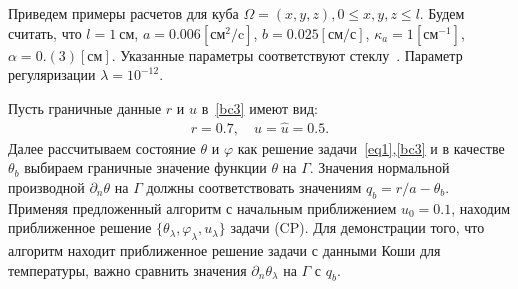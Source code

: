 \documentclass[12pt]{article}
\begin{document}
    Приведем примеры расчетов для куба
    $\Omega = {(x, y, z), 0 \leq x,y,z \leq l}$.
    Будем считать, что $l=1~\text{см}$, $a = 0.006[\text{см}^2/\text{c}]$,
    $b=0.025[\text{см}/\text{с}]$,
    $\kappa_a=1[\text{см}^{-1}]$, $\alpha = 0.(3)[\text{см}]$.
    Указанные параметры соответствуют стеклу~\cite{Grenkin5}.
    Параметр регуляризации $\lambda=10^{-12}.$

    Пусть граничные данные $r$ и $u$ в~\eqref{bc3} имеют вид:
    \begin{gather*}
        r = 0.7,\quad
        u = \hat u = 0.5.
    \end{gather*}
    Далее рассчитываем состояние $\theta$ и $\varphi$ как решение задачи~\eqref{eq1},\eqref{bc3} и в качестве
    $\theta_b$ выбираем граничные значение функции $\theta$ на $\Gamma$.
    Значения нормальной производной $\partial_n\theta$ на $\Gamma$ должны соответствовать
    значениям $q_b=r/a-\theta_b.$
    Применяя предложенный алгоритм с начальным приближением $u_0 = 0.1$, находим приближенное решение
    $\{\theta_\lambda,\varphi_\lambda,u_\lambda\}$ задачи (CP)\@.
    Для демонстрации того, что алгоритм находит приближенное решение задачи с данными
    Коши для температуры, важно сравнить значения $\partial_n\theta_\lambda$ на $\Gamma$ с $q_b.$
\end{document}
